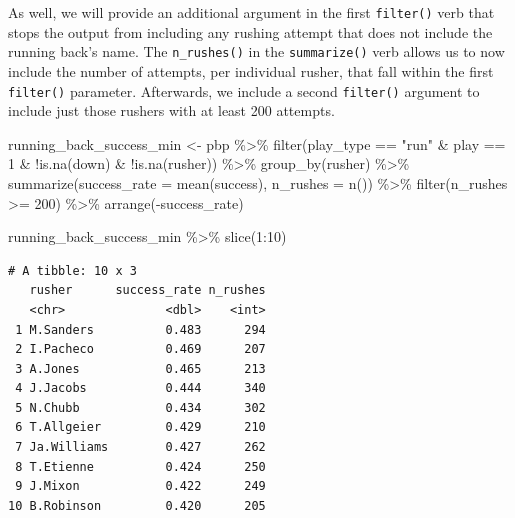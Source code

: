 \documentclass[
  letterpaper,
]{krantz}
\newenvironment{Shaded}{\begin{snugshade}}{\end{snugshade}}
\newcommand{\AttributeTok}[1]{\textcolor[rgb]{0.40,0.45,0.13}{#1}}
\newcommand{\DecValTok}[1]{\textcolor[rgb]{0.68,0.00,0.00}{#1}}
\newcommand{\FunctionTok}[1]{\textcolor[rgb]{0.28,0.35,0.67}{#1}}
\newcommand{\NormalTok}[1]{\textcolor[rgb]{0.00,0.23,0.31}{#1}}
\newcommand{\OtherTok}[1]{\textcolor[rgb]{0.00,0.23,0.31}{#1}}
\newcommand{\SpecialCharTok}[1]{\textcolor[rgb]{0.37,0.37,0.37}{#1}}
\newcommand{\StringTok}[1]{\textcolor[rgb]{0.13,0.47,0.30}{#1}}
\begin{document}
As well, we will provide an additional argument in the first
\texttt{filter()} verb that stops the output from including any rushing
attempt that does not include the running back's name. The
\texttt{n\_rushes()} in the \texttt{summarize()} verb allows us to now
include the number of attempts, per individual rusher, that fall within
the first \texttt{filter()} parameter. Afterwards, we include a second
\texttt{filter()} argument to include just those rushers with at least
200 attempts.

\begin{Shaded}
\begin{Highlighting}[]
\NormalTok{running\_back\_success\_min }\OtherTok{\textless{}{-}}\NormalTok{ pbp }\SpecialCharTok{\%\textgreater{}\%}
  \FunctionTok{filter}\NormalTok{(play\_type }\SpecialCharTok{==} \StringTok{"run"} \SpecialCharTok{\&}\NormalTok{ play }\SpecialCharTok{==} \DecValTok{1} \SpecialCharTok{\&}
           \SpecialCharTok{!}\FunctionTok{is.na}\NormalTok{(down) }\SpecialCharTok{\&}
           \SpecialCharTok{!}\FunctionTok{is.na}\NormalTok{(rusher)) }\SpecialCharTok{\%\textgreater{}\%}
  \FunctionTok{group\_by}\NormalTok{(rusher) }\SpecialCharTok{\%\textgreater{}\%}
  \FunctionTok{summarize}\NormalTok{(}\AttributeTok{success\_rate =} \FunctionTok{mean}\NormalTok{(success),}
            \AttributeTok{n\_rushes =} \FunctionTok{n}\NormalTok{()) }\SpecialCharTok{\%\textgreater{}\%}
  \FunctionTok{filter}\NormalTok{(n\_rushes }\SpecialCharTok{\textgreater{}=} \DecValTok{200}\NormalTok{) }\SpecialCharTok{\%\textgreater{}\%}
  \FunctionTok{arrange}\NormalTok{(}\SpecialCharTok{{-}}\NormalTok{success\_rate)}

\NormalTok{running\_back\_success\_min }\SpecialCharTok{\%\textgreater{}\%}
  \FunctionTok{slice}\NormalTok{(}\DecValTok{1}\SpecialCharTok{:}\DecValTok{10}\NormalTok{)}
\end{Highlighting}
\end{Shaded}

\begin{verbatim}
# A tibble: 10 x 3
   rusher      success_rate n_rushes
   <chr>              <dbl>    <int>
 1 M.Sanders          0.483      294
 2 I.Pacheco          0.469      207
 3 A.Jones            0.465      213
 4 J.Jacobs           0.444      340
 5 N.Chubb            0.434      302
 6 T.Allgeier         0.429      210
 7 Ja.Williams        0.427      262
 8 T.Etienne          0.424      250
 9 J.Mixon            0.422      249
10 B.Robinson         0.420      205
\end{verbatim}
\end{document}
